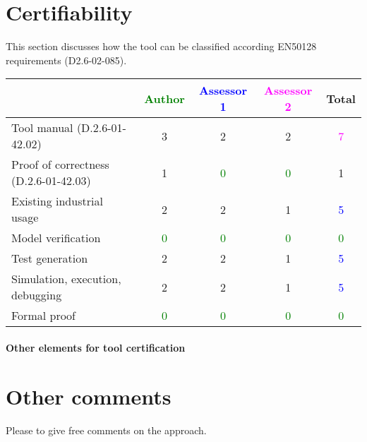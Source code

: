 \section{Certifiability}

This section discusses how the tool can be classified according EN50128 requirements (D2.6-02-085).


\begin{tabular}{|l | c | c | c | c|}
\hline
& \textcolor{green}{Author} & \textcolor{blue}{Assessor 1} & \textcolor{magenta}{Assessor 2} & Total \\
\hline
Tool manual (D.2.6-01-42.02) & 3     & 2     & 2     & \textcolor{magenta}{7} \\
\hline
Proof of correctness (D.2.6-01-42.03) & 1     & \textcolor{green}{0} & \textcolor{green}{0}  & 1     \\
\hline
Existing industrial usage & 2     & 2     & 1     & \textcolor{blue}{5} \\
\hline
Model verification & \textcolor{green}{0} & \textcolor{green}{0} & \textcolor{green}{0} & \textcolor{green}{0} \\
\hline
Test generation & 2     & 2     & 1     & \textcolor{blue}{5} \\
\hline
Simulation, execution, debugging & 2     & 2     & 1     & \textcolor{blue}{5} \\
\hline
Formal proof & \textcolor{green}{0} & \textcolor{green}{0} & \textcolor{green}{0} & \textcolor{green}{0} \\
\hline
\end{tabular}

\paragraph{Other elements for tool certification}

\section{Other comments}
Please to give free comments on the approach.

